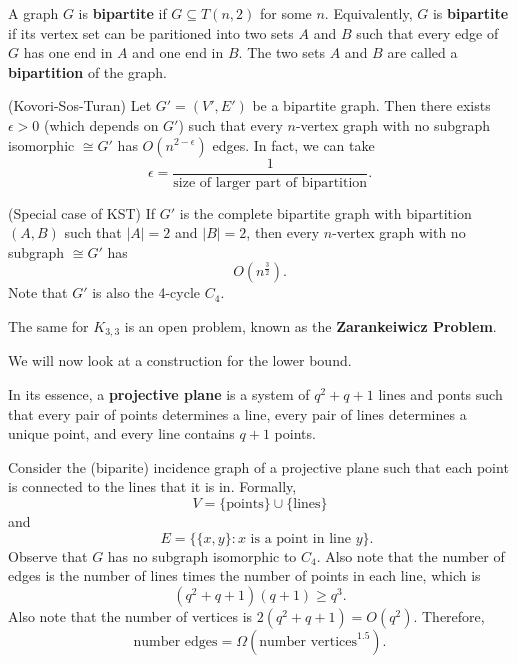 
\begin{definition}
	A graph \( G \) is \textbf{bipartite} if \( G \subseteq T(n, 2) \) for some \( n \). Equivalently, \( G \) is \textbf{bipartite} if its vertex set can be paritioned into two sets \( A \) and \( B \) such that every edge of \( G \) has one end in \( A \) and one end in \( B \). The two sets \( A \) and \( B \) are called a \textbf{bipartition} of the graph.
\end{definition}

\begin{theorem}
	(Kovori-Sos-Turan) Let \( G'=(V',E') \) be a bipartite graph. Then there exists \( \epsilon >0 \) (which depends on \( G' \)) such that every \( n \)-vertex graph with no subgraph isomorphic \( \cong G' \) has \( O(n^{2-\epsilon } ) \) edges. In fact, we can take \[
		\epsilon = \frac{1}{\text{size of larger part of bipartition}}
	.\] 
\end{theorem}

\begin{theorem}
	(Special case of KST) If \( G' \) is the complete bipartite graph with bipartition \( (A,B) \) such that \( |A|=2 \) and \( |B|=2 \), then every \( n \)-vertex graph with no subgraph \( \cong G' \) has \[
		O(n^{\frac{3}{2}} )
	.\] Note that \( G' \) is also the 4-cycle \( C_4 \).
\end{theorem}

\begin{note}
	The same for \( K_{3,3} \) is an open problem, known as the \textbf{Zarankeiwicz Problem}.
\end{note}

We will now look at a construction for the lower bound.

\begin{definition}
	In its essence, a \textbf{projective plane} is a system of \( q^{2} + q + 1  \) lines and ponts such that every pair of points determines a line, every pair of lines determines a unique point, and every line contains \( q+1 \) points.
\end{definition}

\begin{tmpexplanation}
	Consider the (biparite) incidence graph of a projective plane such that each point is connected to the lines that it is in. Formally, \[
		V = \{\text{points}\} \cup \{\text{lines}\} 
	\] and \[ 
		\quad E = \{\{x,y\} : x \text{ is a point in line } y  \}	
	.\] 
	Observe that \( G \) has no subgraph isomorphic to \( C_4 \). Also note that the number of edges is the number of lines times the number of points in each line, which is \[
		(q^{2}+q+1)(q+1) \ge q^{3}  
	.\] Also note that the number of vertices is \( 2(q^{2}+q+1) =O(q^{2})  \). Therefore, \[
		\text{number edges} = \Omega(\text{number vertices}^{1.5} )
	.\] 
\end{tmpexplanation}
